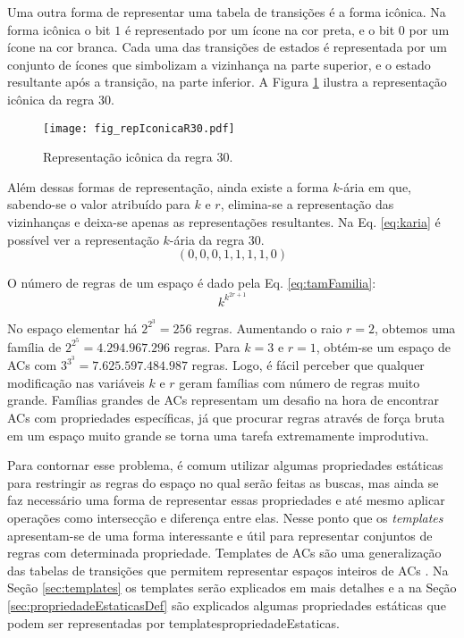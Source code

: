 Uma outra forma de representar uma tabela de transições é a forma icônica. Na forma icônica o bit $1$ é representado por um ícone na cor preta, e o bit $0$ por um ícone na cor branca. Cada uma das transições de estados é representada por um conjunto de ícones que simbolizam a vizinhança na parte superior, e o estado resultante após a transição, na parte inferior. A Figura \ref{fig:repIconicaR30} ilustra a representação icônica da regra 30.
	\begin{figure}[h!]
	  \centering
	  \texttt{[image: fig\_repIconicaR30.pdf]}
	  \caption{Representação icônica da regra 30.}
	  \label{fig:repIconicaR30}
	\end{figure}

Além dessas formas de representação, ainda existe a forma $k$-ária em que, sabendo-se o valor atribuído para $k$ e $r$, elimina-se a representação das vizinhanças e deixa-se apenas as representações resultantes. Na Eq. \eqref{eq:karia} é possível ver a representação $k$-ária da regra 30.
	\begin{equation}
	(0,0,0,1,1,1,1,0)
	\label{eq:karia}
	\end{equation}

O número de regras de um espaço é dado pela Eq. \eqref{eq:tamFamilia}:%
	\begin{equation}
	k^{k^{2r+1}}
	\label{eq:tamFamilia}
	\end{equation}

No espaço elementar há $2^{2^{3}} = 256$ regras. Aumentando o raio $r=2$, obtemos uma família de $2^{2^{5}} = 4.294.967.296$ regras. Para $k=3$ e $r=1$, obtém-se um espaço de ACs com $3^{3^{3}} = 7.625.597.484.987$ regras. Logo, é fácil perceber que qualquer modificação nas variáveis $k$ e $r$ geram famílias com número de regras muito grande. %
Famílias grandes de ACs representam um desafio na hora de encontrar ACs com propriedades específicas, já que procurar regras através de força bruta em um espaço muito grande se torna uma tarefa extremamente improdutiva. %

Para contornar esse problema, é comum utilizar algumas propriedades estáticas para restringir as regras do espaço no qual serão feitas as buscas, mas ainda se faz necessário uma forma de representar essas propriedades e até mesmo aplicar operações como intersecção e diferença entre elas. Nesse ponto que os \textit{templates} apresentam-se de uma forma interessante e útil para representar conjuntos de regras com determinada propriedade. Templates de ACs são uma generalização das tabelas de transições que permitem representar espaços inteiros de ACs \cite{Verardo2014}. Na Seção \ref{sec:templates} os templates serão explicados em mais detalhes e a na Seção \ref{sec:propriedadeEstaticasDef} são explicados algumas propriedades estáticas que podem ser representadas por templatespropriedadeEstaticas. %